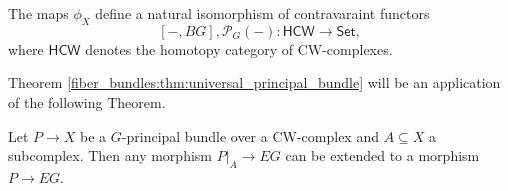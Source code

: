 \begin{corollary}
\label{fiber_bundles:cor:universal_bundle_defines_natural_isomorphism}
    The maps $\phi_X$ define a natural isomorphism of contravaraint functors 
    \[  
        [-,BG], \mathcal{P}_G(-) \colon \mathsf{HCW} \to \mathsf{Set},
    \]
    where $\mathsf{HCW}$ denotes the homotopy category of CW-complexes.
\end{corollary}

Theorem \ref{fiber_bundles:thm:universal_principal_bundle} will be an application of the following Theorem.

\begin{theorem}
    \label{fiber_bundles:thm:extension_theorem}
    Let $P \to X$ be a $G$-principal bundle over a CW-complex and $A \subseteq X$ a subcomplex. Then any morphism $P|_A \to EG$ can be extended to a morphism $P \to EG$. 
\end{theorem}

